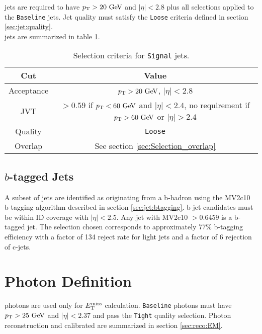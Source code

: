  jets are required to have $\pt > 20\gev$ and $|\eta|<2.8$ plus all selections applied to the {\tt Baseline} jets. Jet quality must satisfy the {\tt Loose} criteria defined in section \ref{sec:jet:quality}. \\

 jets are summarized in table \ref{tb:jets:signal}. \\

\begin{table}[htp]
  \begin{center}
    \begin{tabular}{c|c} \hline \hline
      Cut & Value \\ \hline \hline
      Acceptance & $\pT > 20\gev$, $|\eta| < 2.8$ \\ \hline
      JVT & $> 0.59$ if $\pt < 60 \gev$ and $|\eta| < 2.4$, no requirement if $\pt > 60 \gev$ or $|\eta| > 2.4$ \\ \hline
      Quality & {\tt Loose} \\ \hline
      Overlap & See section \ref{sec:Selection_overlap} \\ \hline
      \hline
    \end{tabular}
    \caption{Selection criteria for {\tt Signal} jets.} 
  \end{center}
  \label{tb:jets:signal}
\end{table}%

\subsection{\boldmath $b$-tagged Jets}

\indent A subset of jets are identified as originating from a b-hadron using the MV2c10 b-tagging algorithm described in section \ref{sec:jet:btagging}.  b-jet candidates must be within ID coverage with $|\eta|<2.5$.  Any jet with MV2c10 $ > 0.6459$ is a b-tagged jet.  The selection chosen corresponds to approximately 77\% b-tagging efficiency with a factor of 134 reject rate for light jets and a factor of 6 rejection of c-jets.\\

\section{Photon Definition}
\label{sec:PhoDef}

 photons are used only for $E_{\mathrm{T}}^{\mathrm{miss}}$ calculation.  {\tt Baseline} photons must have $\pt > 25 \gev$ and $|\eta| < 2.37$ and pass the {\tt Tight} quality selection.  Photon reconstruction and calibrated are summarized in section \ref{sec:reco:EM}. \\

